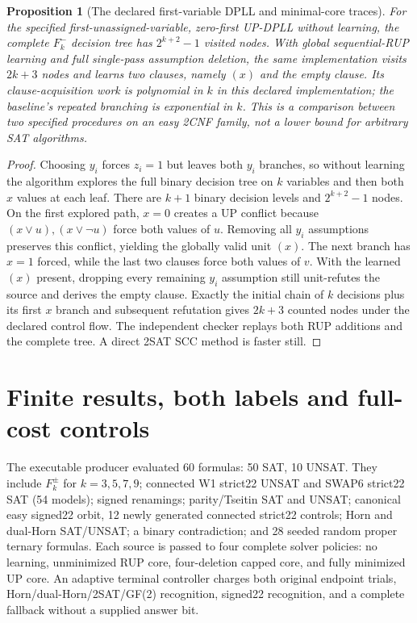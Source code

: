 \documentclass[10pt]{article}
\newtheorem{proposition}{Proposition}
\begin{document}
\begin{proposition}[The declared first-variable DPLL and minimal-core traces]
For the specified first-unassigned-variable, zero-first UP-DPLL without
learning, the complete $F_k^-$ decision tree has $2^{k+2}-1$ visited nodes.
With global sequential-RUP learning and full single-pass assumption deletion,
the same implementation visits $2k+3$ nodes and learns two clauses, namely
$(x)$ and the empty clause. Its clause-acquisition work is polynomial in $k$
in this declared implementation; the baseline's repeated branching is
exponential in $k$. This is a comparison between two specified procedures on an
easy 2CNF family, not a lower bound for arbitrary SAT algorithms.
\end{proposition}
\begin{proof}
Choosing $y_i$ forces $z_i=1$ but leaves both $y_i$ branches, so without
learning the algorithm explores the full binary decision tree on $k$ variables
and then both $x$ values at each leaf. There are $k+1$ binary decision levels
and $2^{k+2}-1$ nodes. On the first explored path, $x=0$ creates a UP conflict
because $(x\vee u),(x\vee\neg u)$ force both values of $u$.
Removing all $y_i$ assumptions preserves this conflict, yielding the globally
valid unit $(x)$. The next branch has $x=1$ forced, while the last two clauses
force both values of $v$. With the learned $(x)$ present, dropping every
remaining $y_i$ assumption still unit-refutes the source and derives the
empty clause. Exactly the initial chain of $k$ decisions plus its first $x$
branch and subsequent refutation gives $2k+3$ counted nodes under the declared
control flow. The independent checker replays both RUP additions and the
complete tree. A direct 2SAT SCC method is faster still.
\end{proof}

\section{Finite results, both labels and full-cost controls}
The executable producer evaluated 60 formulas: 50 SAT, 10 UNSAT. They include
$F_k^\pm$ for $k=3,5,7,9$; connected W1 strict22 UNSAT and SWAP6 strict22 SAT
(54 models); signed renamings; parity/Tseitin SAT and UNSAT; canonical easy
signed22 orbit, 12 newly generated connected strict22 controls; Horn and
 dual-Horn SAT/UNSAT; a binary contradiction; and 28 seeded random proper
ternary formulas. Each source is passed to four complete solver policies:
no learning, unminimized RUP core, four-deletion capped core, and fully
minimized UP core. An adaptive terminal controller charges both original
endpoint trials, Horn/dual-Horn/2SAT/GF(2) recognition, signed22 recognition,
and a complete fallback without a supplied answer bit.
\end{document}
